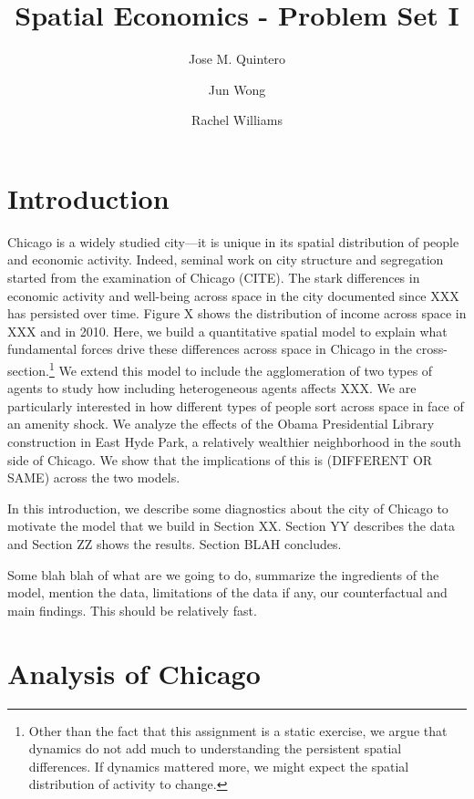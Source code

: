 \documentclass[12pt]{article}
\title{Spatial Economics - Problem Set I}
\author{Jose M. Quintero \and Jun Wong \and Rachel Williams}
\begin{document}
\maketitle

\section{Introduction}


Chicago is a widely studied city---it is unique in its spatial distribution of people and economic activity. Indeed, seminal work on city structure and segregation started from the examination of Chicago (CITE). The stark differences in economic activity and well-being across space in the city documented since XXX has persisted over time. Figure X shows the distribution of income across space in XXX and in 2010. Here, we build a quantitative spatial model to explain what fundamental forces drive these differences across space in Chicago in the cross-section.\footnote{Other than the fact that this assignment is a static exercise, we argue that dynamics do not add much to understanding the persistent spatial differences. If dynamics mattered more, we might expect the spatial distribution of activity to change.} We extend this model to include the agglomeration of two types of agents to study how including heterogeneous agents affects XXX. We are particularly interested in how different types of people sort across space in face of an amenity shock. We analyze the effects of the Obama Presidential Library construction in East Hyde Park, a relatively wealthier neighborhood in the south side of Chicago. We show that the implications of this is (DIFFERENT OR SAME) across the two models.


In this introduction, we describe some diagnostics about the city of Chicago to motivate the model that we build in Section XX. Section YY describes the data and Section ZZ shows the results. Section BLAH concludes.

Some blah blah of what are we going to do, summarize the ingredients of the model, mention the data, limitations of the data if any, our counterfactual and main findings. This should be relatively fast. 

\section{Analysis of Chicago}
\end{document}
